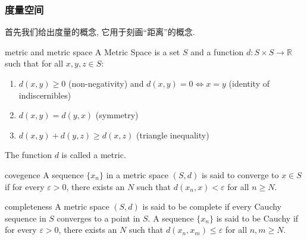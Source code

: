 \subsubsection{度量空间}
首先我们给出度量的概念, 它用于刻画“距离”的概念.
\begin{definition}{metric and metric space}
    A Metric Space is a set $S$ and a function $d: S \times S \to \mathbb{R}$ such that for all $x, y, z \in S$:
    \begin{enumerate}
        \item $d(x, y) \geq 0$ (non-negativity) and $d(x, y) = 0 \iff x = y$ (identity of indiscernibles)
        \item $d(x, y) = d(y, x)$ (symmetry)
        \item $d(x, y) + d(y, z) \geq d(x, z)$ (triangle inequality)
    \end{enumerate}
    The function $d$ is called a metric.
\end{definition}

\begin{definition}{covegence}
    A sequence $\{x_n\}$ in a metric space $(S, d)$ is said to converge to $x \in S$ if for every $\varepsilon > 0$, there exists an $N$ such that $d(x_n, x) < \varepsilon$ for all $n \geq N$.
\end{definition}

\begin{definition}{completeness}
    A metric space $(S, d)$ is said to be complete if every Cauchy sequence in $S$ converges to a point in $S$. 
    A sequence $\{x_n\}$ is said to be Cauchy if for every $\varepsilon > 0$, there exists an $N$ such that $d(x_n, x_m) \leq  \varepsilon$ for all $n, m \geq N$.
\end{definition}
\newpage

